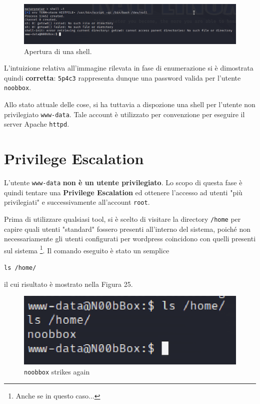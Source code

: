 \documentclass[a4paper, 12pt, oneside]{article}
\begin{document}
\begin{figure}[h!]
    \centering
    \includegraphics[width=\textwidth]{img/meterpreter-shell.png}
    \caption{Apertura di una shell.}
\end{figure}

L'intuizione relativa all'immagine rilevata in fase di enumerazione si è dimostrata quindi \textbf{corretta}: \texttt{5p4c3} rappresenta dunque una password valida per l'utente \texttt{noobbox}.

Allo stato attuale delle cose, si ha tuttavia a dispozione una shell per l'utente non privilegiato \texttt{www-data}. Tale account è utilizzato per convenzione per eseguire il server Apache \texttt{httpd}\cite{www-data}.

\newpage

\section{Privilege Escalation}
L'utente \texttt{www-data} \textbf{non è un utente privilegiato}. Lo scopo di questa fase è quindi tentare una \textbf{Privilege Escalation} ed ottenere l'accesso ad utenti "più privilegiati" e successivamente all'account \texttt{root}.

Prima di utilizzare qualsiasi tool, si è scelto di visitare la directory \texttt{/home} per capire quali utenti "standard" fossero presenti all'interno del sistema, poiché non necessariamente gli utenti configurati per wordpress coincidono con quelli presenti sul sistema \footnote{Anche se in questo caso...}. Il comando eseguito è stato un semplice

\begin{center}
    \texttt{ls /home/}
\end{center}

il cui risultato è mostrato nella Figura 25.

\begin{figure}[h!]
    \centering
    \includegraphics[width=\textwidth]{img/ls-home.png}
    \caption{\texttt{noobbox} strikes again}
\end{figure}
\end{document}
